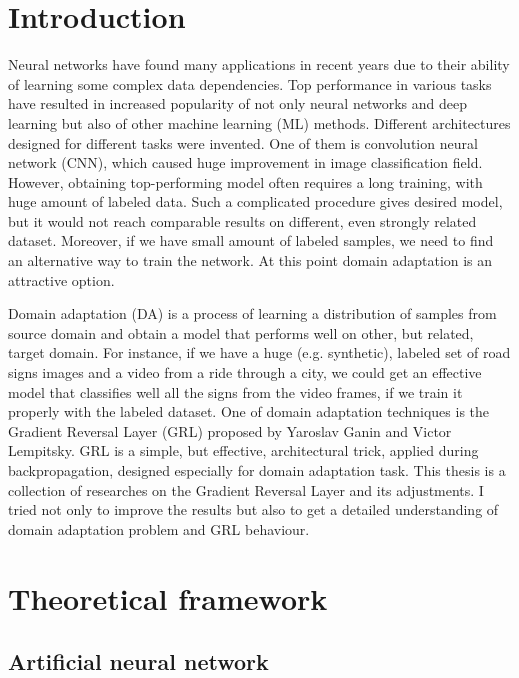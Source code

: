 \documentclass{article}
\begin{document}
\section{Introduction}
Neural networks have found many applications in recent years due to their ability of learning some complex data dependencies. Top performance in various tasks have resulted in increased popularity of not only neural networks and deep learning but also of other machine learning (ML) methods. Different architectures designed for different tasks were invented. One of them is convolution neural network (CNN), which caused huge improvement in image classification field. However, obtaining top-performing model often requires a long training, with huge amount of labeled data. Such a complicated procedure gives desired model, but it would not reach comparable results on different, even strongly related dataset. Moreover, if we  have small amount of labeled samples, we need to find an alternative way to train the network. At this point domain adaptation is an attractive option.
\par
Domain adaptation (DA) is a process of learning a distribution of samples from source domain and obtain a model that performs well on other, but related, target domain. For instance, if we have a huge (e.g. synthetic), labeled set of road signs images and a video from a ride through a city, we could get an effective model that classifies well all the signs from the video frames, if we train it properly with the labeled dataset. One of domain adaptation techniques is the Gradient Reversal Layer (GRL) proposed by Yaroslav Ganin and Victor Lempitsky. GRL is a simple, but effective, architectural trick, applied during backpropagation, designed especially for domain adaptation task. This thesis is a collection of researches on the Gradient Reversal Layer and its adjustments. I tried not only to improve the results but also to get a detailed understanding of domain adaptation problem and GRL behaviour.

\section{Theoretical framework}
\subsection{Artificial neural network}
\end{document}
